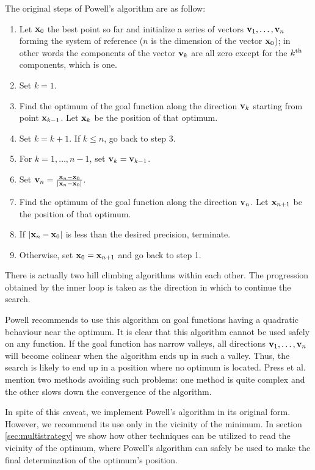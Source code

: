 \noindent The original steps of Powell's algorithm are as follow:
\begin{enumerate}
  \item Let ${\textbf x}_0$ the best point so far and initialize a
  series of vectors ${\textbf v}_1,\ldots,{\textbf v}_n$ forming the system
  of reference ($n$ is the
  dimension of the vector ${\textbf x}_0$); in
  other words the components of the vector ${\textbf v}_k$ are all
  zero except for the $k^{\mathop{\textrm{th}}}$ components, which is one.
  \item Set $k=1$.
  \item Find the optimum of the goal function along the direction ${\textbf
  v}_k$ starting from point ${\textbf x}_{k-1}$. Let ${\textbf x}_k$  be
  the position of that optimum.
  \item Set $k=k+1$. If $k\leq n$, go back to step 3.
  \item For $k=1,\ldots,n-1$, set ${\textbf v}_k={\textbf v}_{k-1}$.
  \item Set ${\textbf v}_n ={ {\textbf x}_n-{\textbf x}_0 \over \left| {\textbf x}_n-{\textbf x}_0\right|}$.
  \item Find the optimum of the goal function along the direction ${\textbf
  v}_n$. Let ${\textbf x}_{n+1}$  be the position of that optimum.
  \item If $\left| {\textbf x}_n-{\textbf x}_0\right|$ is less than the
  desired precision, terminate.
  \item Otherwise, set ${\textbf x}_0={\textbf x}_{n+1}$ and go back to
  step 1.
\end{enumerate}
There is actually two hill climbing algorithms within each other.
The progression obtained by the inner loop is taken as the
direction in which to continue the search.

Powell recommends to use this algorithm on goal functions having a
quadratic behaviour near the optimum. It is clear that this
algorithm cannot be used safely on any function. If the goal
function has narrow valleys, all directions ${\textbf v}_1,\ldots,{\textbf
v}_n$ will become colinear when the algorithm ends up in such a
valley. Thus, the search is likely to end up in a position where
no optimum is located. Press et al. \cite{Press} mention two
methods avoiding such problems: one method is quite complex and
the other slows down the convergence of the algorithm.

In spite of this {\textit caveat}, we implement Powell's algorithm in
its original form. However, we recommend its use only in the
vicinity of the minimum. In section \ref{sec:multistrategy} we
show how other techniques can be utilized to read the vicinity of
the optimum, where Powell's algorithm can safely be used to make
the final determination of the optimum's position.

